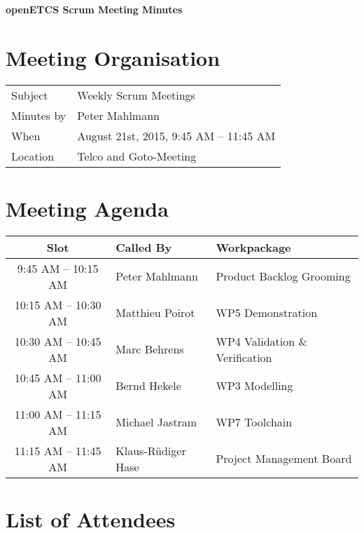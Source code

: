 \documentclass[a4paper, 11pt]{article}
\begin{document}
{\begin{center}\huge\bf openETCS Scrum Meeting Minutes\end{center}}
\section{Meeting Organisation}

\renewcommand{\arraystretch}{1.5}
\begin{supertabular}{m{.2\textwidth}m{.8\textwidth}}
Subject & Weekly Scrum Meetings\\
Minutes by & Peter Mahlmann\\
When & August 21st, 2015, 9:45 AM -- 11:45 AM\\
Location & Telco and Goto-Meeting\\
\end{supertabular}

\renewcommand{\arraystretch}{1.0}
\section{Meeting Agenda}

\begin{tabular}{cll}
\toprule
\textbf{Slot} &  \textbf{Called By} & \textbf{Workpackage} \\
\midrule 
9:45 AM -- 10:15 AM & Peter Mahlmann & Product Backlog Grooming  \\
10:15 AM -- 10:30 AM & Matthieu Poirot & WP5 Demonstration \\  
10:30 AM -- 10:45 AM & Marc Behrens & WP4 Validation \& Verification \\
10:45 AM -- 11:00 AM & Bernd Hekele & WP3 Modelling \\
11:00 AM -- 11:15 AM & Michael Jastram  & WP7 Toolchain \\
11:15 AM -- 11:45 AM & Klaus-R\"udiger Hase & Project Management Board \\
\bottomrule
\end{tabular}

\section{List of Attendees}
\end{document}
